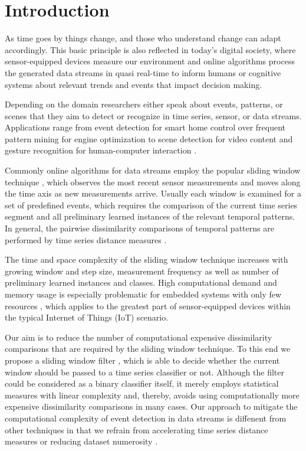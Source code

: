 \section{Introduction} \label{introduction}

As time goes by things change, and those who understand change can adapt accordingly. This basic principle is also reflected in today's digital society, where sensor-equipped devices measure our environment and online algorithms process the generated data streams in quasi real-time to inform humans or cognitive systems about relevant trends and events that impact decision making. 

Depending on the domain researchers either speak about events, patterns, or scenes that they aim to detect or recognize in time series, sensor, or data streams. Applications range from event detection for smart home control \cite{spiegel2015metering} over frequent pattern mining for engine optimization \cite{spiegel2015driving} to scene detection for video content \cite{acar2011mediaeval} and gesture recognition for human-computer interaction \cite{liu2009uwave}.

Commonly online algorithms for data streams employ the popular sliding window technique \cite{keogh2004sliding}, which observes the most recent sensor measurements and moves along the time axis as new measurements arrive. Usually each window is examined for a set of predefined events, which requires the comparison of the current time series segment and all preliminary learned instances of the relevant temporal patterns. In general, the pairwise dissimilarity comparisons of temporal patterns are performed by time series distance measures \cite{spiegel2015diss}.

The time and space complexity of the sliding window technique increases with growing window and step size, measurement frequency as well as number of preliminary learned instances and classes. High computational demand and memory usage is especially problematic for embedded systems with only few resources \cite{kratz2011mobile,wilhelm2015ring}, which applies to the greatest part of sensor-equipped devices within the typical Internet of Things (IoT) scenario. 

Our aim is to reduce the number of computational expensive dissimilarity comparisons that are required by the sliding window technique. To this end we propose a sliding window filter \cite{lesti2017filter}, which is able to decide whether the current window should be passed to a time series classifier or not. Although the filter could be considered as a binary classifier itself, it merely employs statistical measures with linear complexity and, thereby, avoids using computationally more expensive dissimilarity comparisons in many cases. Our approach to mitigate the computational complexity of event detection in data streams is diffenent from other techniques in that we refrain from accelerating time series distance measures \cite{sart2010accelerating,spiegel2014lucky} or reducing dataset numerosity \cite{xi2006fast}. 

